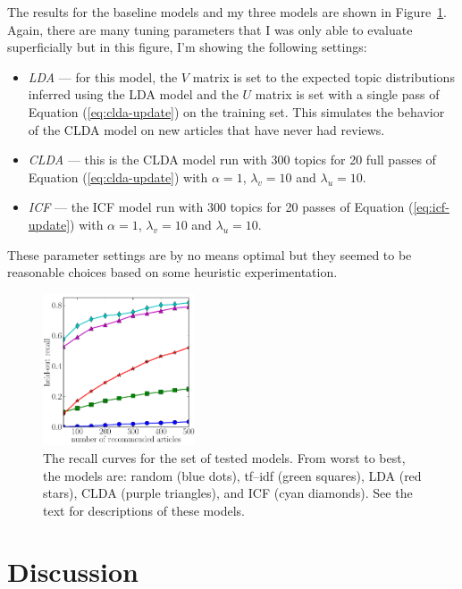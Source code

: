 \documentclass[11pt]{article}
\newcommand{\eq}[1]{Equation (\ref{eq:#1})}
\newcommand{\fig}[1]{Figure~\ref{fig:#1}}
\newcommand{\figlabel}[1]{\label{fig:#1}}
\begin{document}
The results for the baseline models and my three models are shown in
\fig{results}.
Again, there are many tuning parameters that I was only able to evaluate
superficially but in this figure, I'm showing the following settings:
\begin{itemize}
\item{\emph{LDA} --- for this model, the $V$ matrix is set to the expected
topic distributions inferred using the LDA model and the $U$ matrix is set
with a single pass of \eq{clda-update} on the training set.
This simulates the behavior of the CLDA model on new articles that have never
had reviews.}
\item{\emph{CLDA} --- this is the CLDA model run with 300 topics for 20 full
passes of \eq{clda-update} with $\alpha=1$, $\lambda_v=10$ and $\lambda_u=10$.}
\item{\emph{ICF} --- the ICF model run with 300 topics for 20 passes of
\eq{icf-update} with $\alpha=1$, $\lambda_v=10$ and $\lambda_u=10$.}
\end{itemize}
These parameter settings are by no means optimal but they seemed to be
reasonable choices based on some heuristic experimentation.

\begin{figure}
\centering
\includegraphics[width=0.4\textwidth]{results.pdf}
\caption{%
The recall curves for the set of tested models.
From worst to best, the models are: random (blue dots), tf--idf (green
squares), LDA (red stars), CLDA (purple triangles), and ICF (cyan diamonds).
See the text for descriptions of these models.
\figlabel{results}}
\end{figure}

\section{Discussion}
\end{document}
